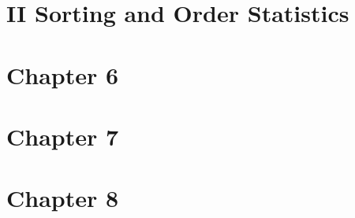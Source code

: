 \documentclass[12pt,a4paper]{article}
\begin{document}



\pagebreak


\section*{II Sorting and Order Statistics}
\pagebreak

\section*{Chapter 6}





\pagebreak

\section*{Chapter 7}








\pagebreak


\section*{Chapter 8}









\pagebreak
\end{document}
